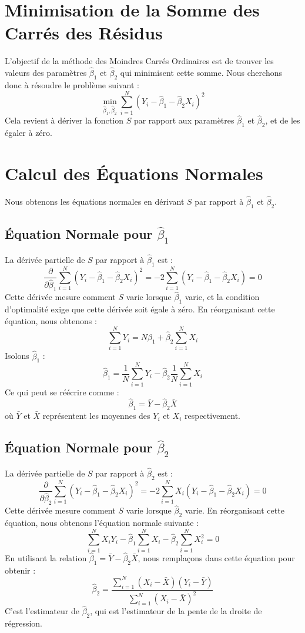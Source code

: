 \documentclass[14pt]{extarticle} %
\begin{document}
\section{Minimisation de la Somme des Carrés des Résidus}
L'objectif de la méthode des Moindres Carrés Ordinaires est de trouver les valeurs des paramètres \(\hat{\beta}_1\) et \(\hat{\beta}_2\) qui minimisent cette somme. Nous cherchons donc à résoudre le problème suivant :
\[
\min_{\hat{\beta}_1, \hat{\beta}_2} \sum_{i=1}^N (Y_i - \hat{\beta}_1 - \hat{\beta}_2 X_i)^2
\]
Cela revient à dériver la fonction \(S\) par rapport aux paramètres \(\hat{\beta}_1\) et \(\hat{\beta}_2\), et de les égaler à zéro.

\section{Calcul des Équations Normales}
Nous obtenons les équations normales en dérivant \(S\) par rapport à \(\hat{\beta}_1\) et \(\hat{\beta}_2\).

\subsection{Équation Normale pour \(\hat{\beta}_1\)}
La dérivée partielle de \(S\) par rapport à \(\hat{\beta}_1\) est :
\[
\frac{\partial}{\partial \hat{\beta}_1} \sum_{i=1}^N (Y_i - \hat{\beta}_1 - \hat{\beta}_2 X_i)^2 = -2 \sum_{i=1}^N (Y_i - \hat{\beta}_1 - \hat{\beta}_2 X_i) = 0
\]
Cette dérivée mesure comment \(S\) varie lorsque \(\hat{\beta}_1\) varie, et la condition d'optimalité exige que cette dérivée soit égale à zéro. En réorganisant cette équation, nous obtenons :
\[
\sum_{i=1}^N Y_i = N \hat{\beta}_1 + \hat{\beta}_2 \sum_{i=1}^N X_i
\]
Isolons \(\hat{\beta}_1\) :
\[
\hat{\beta}_1 = \frac{1}{N} \sum_{i=1}^N Y_i - \hat{\beta}_2 \frac{1}{N} \sum_{i=1}^N X_i
\]
Ce qui peut se réécrire comme :
\[
\hat{\beta}_1 = \bar{Y} - \hat{\beta}_2 \bar{X}
\]
où \(\bar{Y}\) et \(\bar{X}\) représentent les moyennes des \(Y_i\) et \(X_i\) respectivement.

\subsection{Équation Normale pour \(\hat{\beta}_2\)}
La dérivée partielle de \(S\) par rapport à \(\hat{\beta}_2\) est :
\[
\frac{\partial}{\partial \hat{\beta}_2} \sum_{i=1}^N (Y_i - \hat{\beta}_1 - \hat{\beta}_2 X_i)^2 = -2 \sum_{i=1}^N X_i (Y_i - \hat{\beta}_1 - \hat{\beta}_2 X_i) = 0
\]
Cette dérivée mesure comment \(S\) varie lorsque \(\hat{\beta}_2\) varie. En réorganisant cette équation, nous obtenons l'équation normale suivante :
\[
\sum_{i=1}^N X_i Y_i - \hat{\beta}_1 \sum_{i=1}^N X_i - \hat{\beta}_2 \sum_{i=1}^N X_i^2 = 0
\]
En utilisant la relation \(\hat{\beta}_1 = \bar{Y} - \hat{\beta}_2 \bar{X}\), nous remplaçons dans cette équation pour obtenir :
\[
\hat{\beta}_2 = \frac{\sum_{i=1}^N (X_i - \bar{X})(Y_i - \bar{Y})}{\sum_{i=1}^N (X_i - \bar{X})^2}
\]
C'est l'estimateur de \(\hat{\beta}_2\), qui est l'estimateur de la pente de la droite de régression.
\end{document}
